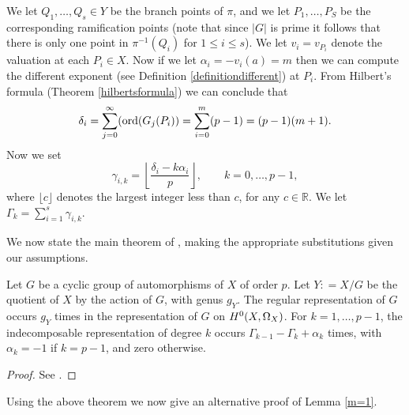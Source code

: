 We let $Q_1, \ldots, Q_s \in Y$ be the branch points of $\pi$, and we let $P_1, \ldots, P_S$ be the corresponding ramification points (note that since $|G|$ is prime it follows that there is only one point in $\pi^{-1}(Q_i)$ for $1 \leq i \leq s$).
We let $v_i = v_{P_i}$ denote the valuation at each $P_i \in X$.
Now if we let $\alpha_i = -v_i(a) = m$ then we can compute the different exponent (see Definition \ref{definitiondifferent}) at $P_i$.
From Hilbert's formula (Theorem \ref{hilbertsformula}) we can conclude that
    \[
    \delta_i = \sum_{j=0}^\infty (\operatorname{ord}(G_j(P_i)) = \sum_{i=0}^{m}(p-1) = (p-1)(m+1).
    \]
Now we set
    \[
    \gamma_{i,k} = \left\lfloor \frac{\delta_i - k \alpha_i}{p} \right\rfloor, \qquad k = 0, \ldots, p-1,
    \]
where $\lfloor c \rfloor$ denotes the largest integer less than $c$, for any $c \in \mathbb R$.
We let $\Gamma_k = \sum_{i=1}^s \gamma_{i,k}$.

We now state the main theorem of \cite{valmadan}, making the appropriate substitutions given our assumptions.

    \begin{thm}\label{theoremofvalentiniandmadan}
    Let $G$ be a cyclic group of automorphisms of $X$ of order $p$.
    Let $Y : = X/G$ be the quotient of $X$ by the action of $G$, with genus $g_Y$.
    The regular representation of $G$ occurs $g_Y$ times in the representation of $G$ on ${H^0(X,\Omega_X)}$.
    For $k=1, \ldots, p-1$, the indecomposable representation of degree $k$ occurs $\Gamma_{k-1} - \Gamma_k + \alpha_k$ times, with $\alpha_k = -1$ if $k = p-1$, and zero otherwise.
    \end{thm}
    \begin{proof}
    See \cite[Thm.\ 1]{valmadan}.
    \end{proof}

Using the above theorem we now give an alternative proof of Lemma \ref{m=1}.

